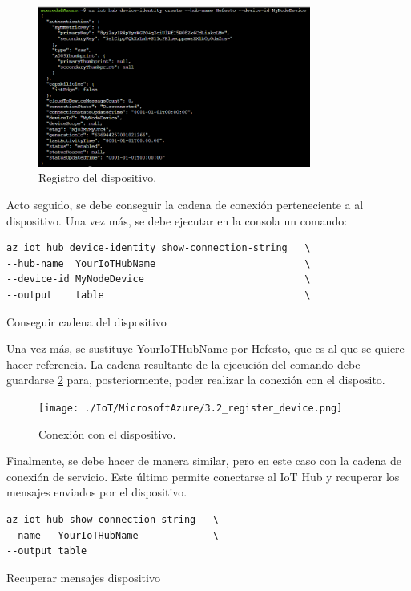 \documentclass[english,runningheads,a4paper]{llncs}[2018/03/10]
\begin{document}
\begin{figure}[h!]
 \centering
 \includegraphics[width=0.8\textwidth]{./IoT/MicrosoftAzure/3-1_register_device.png}
 \caption{Registro del dispositivo.}
 \label{register}
\end{figure}

Acto seguido, se debe conseguir la cadena de conexión perteneciente a al
dispositivo. Una vez más, se debe ejecutar en la consola un comando:

\begin{listing}[htp]
\centering
    \begin{verbatim}
az iot hub device-identity show-connection-string   \
--hub-name  YourIoTHubName                          \
--device-id MyNodeDevice                            \
--output    table                                   \
    \end{verbatim}
\caption{Conseguir cadena del dispositivo}
\label{condevcommand}
\end{listing}

Una vez más, se sustituye YourIoTHubName por Hefesto, que es al que se quiere
hacer referencia. La cadena resultante de la ejecución del comando debe 
guardarse \hyperref[constring]{\ref{constring}} para, posteriormente, poder 
realizar la conexión con el disposito.

\begin{figure}[h!]
 \centering
 \texttt{[image: ./IoT/MicrosoftAzure/3.2\_register\_device.png]}
 \caption{Conexión con el dispositivo.}
 \label{constring}
\end{figure}

Finalmente, se debe hacer de manera similar, pero en este caso con la cadena de
conexión de servicio. Este último permite conectarse al IoT Hub y recuperar los
mensajes enviados por el dispositivo.

\begin{listing}[htp]
\centering
    \begin{verbatim}
az iot hub show-connection-string   \
--name   YourIoTHubName             \
--output table
    \end{verbatim}
\caption{Recuperar mensajes dispositivo}
\label{consercommand}
\end{listing}
\end{document}
